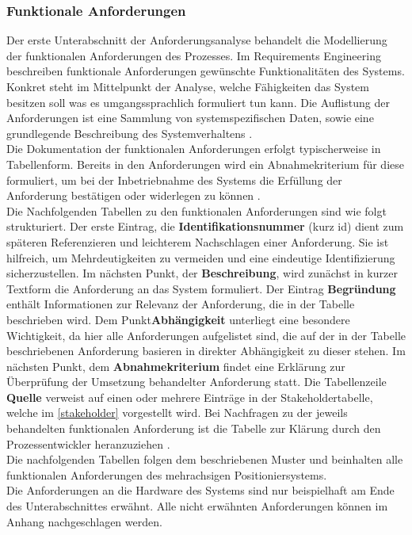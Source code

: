 \documentclass[../../../Bachelorarbeit.tex]{subfiles}
\begin{document}
\subsubsection{Funktionale Anforderungen}
Der erste Unterabschnitt der Anforderungsanalyse behandelt die Modellierung der funktionalen Anforderungen des Prozesses. Im Requirements Engineering beschreiben funktionale Anforderungen gewünschte Funktionalitäten des Systems. Konkret steht im Mittelpunkt der Analyse, welche Fähigkeiten das System besitzen soll \bzw was es umgangssprachlich formuliert tun kann. Die Auflistung der Anforderungen ist eine Sammlung von systemspezifischen Daten, sowie eine grundlegende Beschreibung des Systemverhaltens \cite[338]{Lauber1999}. \\
Die Dokumentation der funktionalen Anforderungen erfolgt typischerweise in Tabellenform. Bereits in den Anforderungen wird ein Abnahmekriterium für diese formuliert, um bei der Inbetriebnahme des Systems die Erfüllung der Anforderung bestätigen oder widerlegen zu können \cite[55]{Kleuker2013}.\\
Die Nachfolgenden Tabellen zu den funktionalen Anforderungen sind wie folgt strukturiert. Der erste Eintrag, die \textbf{Identifikationsnummer} (kurz \acs{id}) dient zum späteren Referenzieren und leichterem Nachschlagen einer Anforderung. Sie ist hilfreich, um Mehrdeutigkeiten zu vermeiden und eine eindeutige Identifizierung sicherzustellen. Im nächsten Punkt, der \textbf{Beschreibung}, wird zunächst in kurzer Textform die Anforderung an das System formuliert. Der Eintrag \textbf{Begründung} enthält Informationen zur Relevanz der Anforderung, die in der Tabelle beschrieben wird. Dem Punkt\textbf{Abhängigkeit} unterliegt eine besondere Wichtigkeit, da hier alle Anforderungen aufgelistet sind, die auf der in der Tabelle beschriebenen Anforderung basieren \bzw in direkter Abhängigkeit zu dieser stehen. Im nächsten Punkt, dem \textbf{Abnahmekriterium} findet eine Erklärung zur Überprüfung der Umsetzung behandelter Anforderung statt. Die Tabellenzeile \textbf{Quelle} verweist auf einen oder mehrere Einträge in der Stakeholdertabelle, welche im \autoref{stakeholder} vorgestellt wird. Bei Nachfragen zu der jeweils behandelten funktionalen Anforderung ist die Tabelle zur Klärung durch den Prozessentwickler heranzuziehen \cite[56]{Kleuker2013}. \\
Die nachfolgenden Tabellen folgen dem beschriebenen Muster und beinhalten alle funktionalen Anforderungen des mehrachsigen Positioniersystems.\\  Die Anforderungen an die Hardware des Systems sind nur beispielhaft am Ende des Unterabschnittes erwähnt. Alle nicht erwähnten Anforderungen können im Anhang nachgeschlagen werden.
\end{document}
